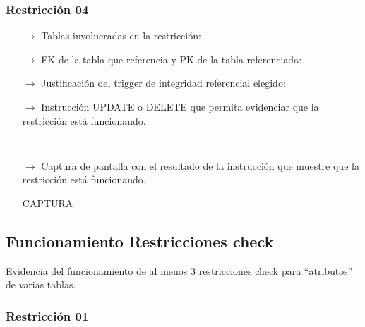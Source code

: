 \subsubsection*{Restricción 04}

\begin{itemize}
    \item[$\rightarrow$] Tablas involucradas en la restricción: 
    \item[$\rightarrow$] FK de la tabla que referencia y PK de la tabla referenciada: 
    \item[$\rightarrow$] Justificación del trigger de integridad referencial elegido: 
    \item[$\rightarrow$] Instrucción UPDATE o DELETE que permita evidenciar que la restricción está funcionando.
        \begin{verbatim}
    
        \end{verbatim}

    \item[$\rightarrow$] Captura de pantalla con el resultado de la instrucción que muestre que la restricción está funcionando.
    
        \begin{center}
            CAPTURA
        \end{center}

\end{itemize}


\subsection{Funcionamiento Restricciones check}

Evidencia del funcionamiento de al menos 3 restricciones check para “atributos” de varias
tablas.

\subsubsection*{Restricción 01}

